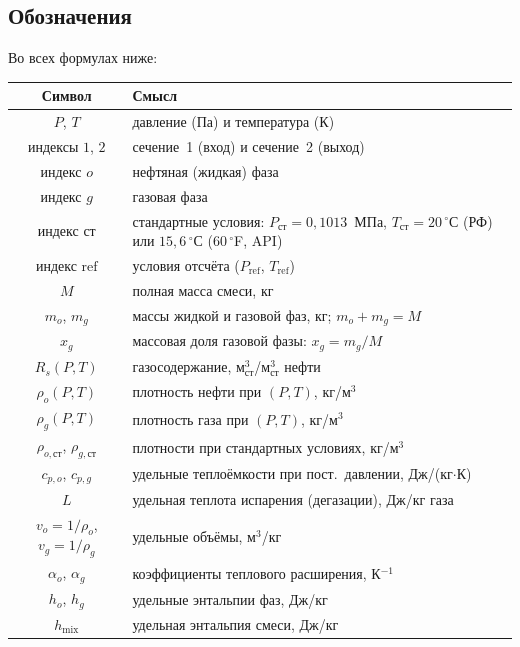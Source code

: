 \documentclass[12pt,a4paper]{article}
\begin{document}
\subsection{Обозначения}

Во всех формулах ниже:
\begin{center}
\renewcommand{\arraystretch}{1.25}
\begin{tabular}{cl}
  \hline
  Символ & Смысл \\
  \hline
  $P$, $T$                  & давление (Па) и температура (К) \\
  индексы $1$, $2$          & сечение~1 (вход) и сечение~2 (выход) \\
  индекс $o$                & нефтяная (жидкая) фаза \\
  индекс $g$                & газовая фаза \\
  индекс $\text{ст}$        & стандартные условия: $P_{\text{ст}} = 0{,}1013$~МПа,
                               $T_{\text{ст}} = 20\,{}^\circ$С (РФ) или $15{,}6\,{}^\circ$С ($60\,{}^\circ$F, API) \\
  индекс $\mathrm{ref}$     & условия отсчёта ($P_{\mathrm{ref}}$, $T_{\mathrm{ref}}$) \\
  $M$                       & полная масса смеси, кг \\
  $m_o$, $m_g$              & массы жидкой и газовой фаз, кг; $m_o + m_g = M$ \\
  $x_g$                     & массовая доля газовой фазы: $x_g = m_g / M$ \\
  $R_s(P,T)$                & газосодержание, м$^3_{\text{ст}}$/м$^3_{\text{ст}}$ нефти \\
  $\rho_{o}(P,T)$           & плотность нефти при $(P,T)$, кг/м$^3$ \\
  $\rho_{g}(P,T)$           & плотность газа при $(P,T)$, кг/м$^3$ \\
  $\rho_{o,\text{ст}}$, $\rho_{g,\text{ст}}$
                             & плотности при стандартных условиях, кг/м$^3$ \\
  $c_{p,o}$, $c_{p,g}$      & удельные теплоёмкости при пост.\ давлении, Дж/(кг$\cdot$К) \\
  $L$                        & удельная теплота испарения (дегазации), Дж/кг газа \\
  $v_o = 1/\rho_o$, $v_g = 1/\rho_g$ & удельные объёмы, м$^3$/кг \\
  $\alpha_o$, $\alpha_g$    & коэффициенты теплового расширения, К$^{-1}$ \\
  $h_o$, $h_g$              & удельные энтальпии фаз, Дж/кг \\
  $h_{\mathrm{mix}}$        & удельная энтальпия смеси, Дж/кг \\
  \hline
\end{tabular}
\end{center}
\end{document}
